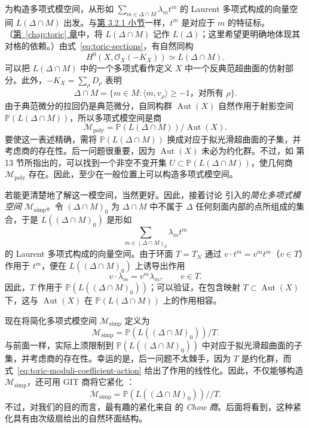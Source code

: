 为构造多项式模空间，从形如 $\sum_{m\in\Delta\cap M}\lambda_m t^m$ 的 Laurent 多项式构成的向量空间 $L(\Delta\cap M)$ 出发。与\hyperref[subsec:toric-polytopes]{第 3.2.1 小节}一样，$t^m$ 是对应于 $m$ 的特征标。（\hyperref[chap:toric]{第~\ref*{chap:toric} 章}中，将 $L(\Delta\cap M)$ 记作 $L(\Delta)$；这里希望更明确地体现其对格的依赖。）由式~\eqref{eq:toric-sections}，有自然同构
\[
H^0(X,\mathcal O_X(-K_X))\simeq L(\Delta\cap M).
\]
可以把 $L(\Delta\cap M)$ 中的一个多项式看作定义 $X$ 中一个反典范超曲面的仿射部分。此外，$-K_X=\sum_\rho D_\rho$ 表明
\[
\Delta\cap M=\{m\in M:\langle m,v_\rho\rangle\geq-1\text{，对所有 }\rho\}.
\]
由于典范微分的拉回仍是典范微分，自同构群 $\operatorname{Aut}(X)$ 自然作用于射影空间 $\mathbb P(L(\Delta\cap M))$，所以多项式模空间是商
\[
\mathcal M_{\mathrm{poly}}=\mathbb P(L(\Delta\cap M))/\operatorname{Aut}(X).
\]
要使这一表述精确，需将 $\mathbb P(L(\Delta\cap M))$ 换成对应于拟光滑超曲面的子集，并考虑商的存在性。后一问题很重要，因为 $\operatorname{Aut}(X)$ 未必为约化群。不过，如  第 13 节所指出的，可以找到一个非空不变开集
$U\subset\mathbb P(L(\Delta\cap M))$，使几何商 $\mathcal M_{\mathrm{poly}}$ 存在。因此，至少在一般位置上可以构造多项式模空间。

若能更清楚地了解这一模空间，当然更好。因此，接着讨论  引入的\emph{简化多项式模空间} $\mathcal M_{\mathrm{simp}}$。令 $(\Delta\cap M)_0$ 为 $\Delta\cap M$ 中不属于 $\Delta$ 任何刻面内部的点所组成的集合，于是 $L((\Delta\cap M)_0)$ 是形如
\[
\sum_{m\in(\Delta\cap M)_0}\lambda_m t^m
\]
的 Laurent 多项式构成的向量空间。由于环面 $T=T_N$ 通过 $v\cdot t^m=v^m t^m$（$v\in T$）作用于 $t^m$，便在 $L((\Delta\cap M)_0)$ 上诱导出作用
\begin{equation}\label{eq:toric-moduli-coefficient-action}
v\cdot\lambda_m=v^m\lambda_m,\qquad v\in T.
\end{equation}
因此，$T$ 作用于 $\mathbb P(L((\Delta\cap M)_0))$；可以验证，在包含映射 $T\subset\operatorname{Aut}(X)$ 下，这与 $\operatorname{Aut}(X)$ 在 $\mathbb P(L(\Delta\cap M))$ 上的作用相容。

现在将简化多项式模空间 $\mathcal M_{\mathrm{simp}}$ 定义为
\[
\mathcal M_{\mathrm{simp}}=\mathbb P(L((\Delta\cap M)_0))/T.
\]
与前面一样，实际上须限制到 $\mathbb P(L((\Delta\cap M)_0))$ 中对应于拟光滑超曲面的子集，并考虑商的存在性。幸运的是，后一问题不太棘手，因为 $T$ 是约化群，而式~\eqref{eq:toric-moduli-coefficient-action} 给出了作用的线性化。因此，不仅能够构造 $\mathcal M_{\mathrm{simp}}$，还可用 GIT 商将它紧化 ：
\[
\overline{\mathcal M}_{\mathrm{simp}}=\mathbb P(L((\Delta\cap M)_0))/\!/T.
\]
不过，对我们的目的而言，最有趣的紧化来自  的 \emph{Chow 商}。后面将看到，这种紧化具有由次级扇给出的自然环面结构。

